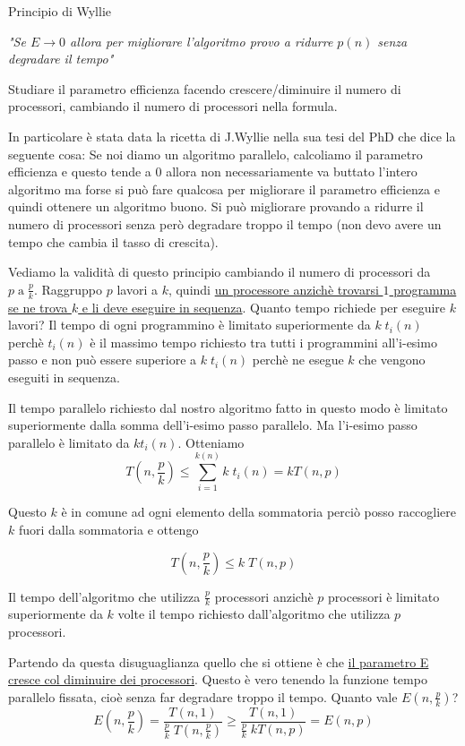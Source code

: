 \begin{dimostrazione} Principio di Wyllie

    \textit{"Se $E \rightarrow 0$ allora per migliorare l'algoritmo provo a ridurre $p(n)$ senza degradare il tempo"}

    Studiare il parametro efficienza facendo crescere/diminuire il numero di processori, cambiando il numero di processori nella formula.

    In particolare è stata data la ricetta di J.Wyllie nella sua tesi del PhD che dice la seguente cosa:
    Se noi diamo un algoritmo parallelo, calcoliamo il parametro efficienza e questo tende a $0$ allora non necessariamente va buttato l'intero algoritmo ma forse si può fare qualcosa per migliorare il parametro efficienza e quindi ottenere un algoritmo buono. Si può migliorare provando a ridurre il numero di processori senza però degradare troppo il tempo (non devo avere un tempo che cambia il tasso di crescita).

    Vediamo la validità di questo principio cambiando il numero di processori da $p\; \text{a}\; \frac{p}{k}$. Raggruppo $p$ lavori a $k$, quindi \uline{un processore anzichè trovarsi $1$ programma se ne trova $k$ e li deve eseguire in sequenza}. Quanto tempo richiede per eseguire $k$ lavori? Il tempo di ogni programmino è limitato superiormente da $k\;t_i(n)$ perchè $t_i(n)$ è il massimo tempo richiesto tra tutti i programmini all'i-esimo passo e non può essere superiore a $k\;t_i(n)$ perchè ne esegue $k$ che vengono eseguiti in sequenza.

    Il tempo parallelo richiesto dal nostro algoritmo fatto in questo modo è limitato superiormente dalla somma dell'i-esimo passo parallelo. Ma l'i-esimo passo parallelo è limitato da $kt_i(n)$. Otteniamo
    $$T(n, \frac{p}{k}) \leq \sum_{i=1}^{k(n)} k\;t_i(n) = k T(n,p)$$

    Questo $k$ è in comune ad ogni elemento della sommatoria perciò posso raccogliere $k$ fuori dalla sommatoria e ottengo

    $$T(n,\frac{p}{k}) \leq k\;T(n, p)$$
    
    Il tempo dell'algoritmo che utilizza $\frac{p}{k}$ processori anzichè $p$ processori è limitato superiormente da $k$ volte il tempo richiesto dall'algoritmo che utilizza $p$ processori.

    Partendo da questa disuguaglianza quello che si ottiene è che \uline{il parametro E cresce col diminuire dei processori}. Questo è vero tenendo la funzione tempo parallelo fissata, cioè senza far degradare troppo il tempo. Quanto vale $E(n, \frac{p}{k})$?
    $$E(n,\frac{p}{k}) = \frac{T(n,1)}{\frac{p}{k}\;T(n,\frac{p}{k})} \geq \frac{T(n,1)}{\frac{p}{k}\;kT(n,p)} = E(n,p)$$


\end{dimostrazione}
